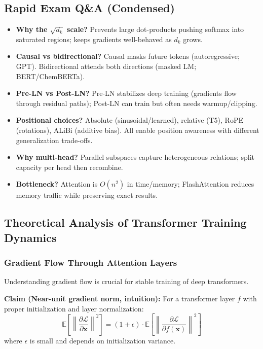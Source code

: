 \documentclass[11pt]{article}
\begin{document}
\subsection{Rapid Exam Q\&A (Condensed)}
\begin{itemize}[leftmargin=1.5em]
    \item \textbf{Why the $\sqrt{d_k}$ scale?} Prevents large dot-products pushing softmax into saturated regions; keeps gradients well-behaved as $d_k$ grows.
    \item \textbf{Causal vs bidirectional?} Causal masks future tokens (autoregressive; GPT). Bidirectional attends both directions (masked LM; BERT/ChemBERTa).
    \item \textbf{Pre-LN vs Post-LN?} Pre-LN stabilizes deep training (gradients flow through residual paths); Post-LN can train but often needs warmup/clipping.
    \item \textbf{Positional choices?} Absolute (sinusoidal/learned), relative (T5), RoPE (rotations), ALiBi (additive bias). All enable position awareness with different generalization trade-offs.
    \item \textbf{Why multi-head?} Parallel subspaces capture heterogeneous relations; split capacity per head then recombine.
    \item \textbf{Bottleneck?} Attention is $O(n^2)$ in time/memory; FlashAttention reduces memory traffic while preserving exact results.
\end{itemize}

\subsection{Theoretical Analysis of Transformer Training Dynamics}

\subsubsection{Gradient Flow Through Attention Layers}

Understanding gradient flow is crucial for stable training of deep transformers.

\textbf{Claim (Near-unit gradient norm, intuition):} For a transformer layer $f$ with proper initialization and layer normalization:
\begin{equation}
\mathbb{E}\left[\left\|\frac{\partial \mathcal{L}}{\partial \mathbf{x}}\right\|^2\right] = (1 + \epsilon) \cdot \mathbb{E}\left[\left\|\frac{\partial \mathcal{L}}{\partial f(\mathbf{x})}\right\|^2\right]
\end{equation}
where $\epsilon$ is small and depends on initialization variance.
\end{document}
